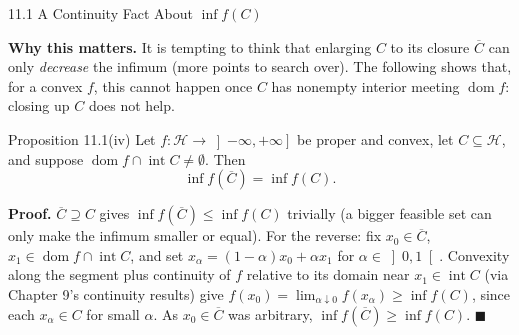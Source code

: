 \documentclass[aspectratio=169,10pt]{beamer}
\newcommand{\mHH}{\mathcal H}
\newcommand{\dom}{\operatorname{dom}}
\newcommand{\intr}{\operatorname{int}}
\begin{document}
\begin{frame}{11.1 A Continuity Fact About $\inf f(C)$}

  \textbf{Why this matters.} It is tempting to think that enlarging
  $C$ to its closure $\overline C$ can only \emph{decrease} the
  infimum (more points to search over). The following shows that,
  for a convex $f$, this cannot happen once $C$ has nonempty
  interior meeting $\dom f$: closing up $C$ does not help.

  \begin{block}{Proposition 11.1(iv)}
    Let $f:\mHH\to\left]-\infty,+\infty\right]$ be proper and convex,
    let $C\subseteq\mHH$, and suppose $\dom f\cap\intr C\neq\emptyset$.
    Then
    \[
      \inf f(\overline C) = \inf f(C).
    \]
  \end{block}

  \textbf{Proof.} $\overline C\supseteq C$ gives
  $\inf f(\overline C)\le\inf f(C)$ trivially (a bigger feasible set
  can only make the infimum smaller or equal). For the reverse: fix
  $x_0\in\overline C$, $x_1\in\dom f\cap\intr C$, and set
  $x_\alpha=(1-\alpha)x_0+\alpha x_1$ for $\alpha\in\left]0,1\right[$.
  Convexity along the segment plus continuity of $f$ relative to its
  domain near $x_1\in\intr C$ (via Chapter 9's continuity results)
  give $f(x_0)=\lim_{\alpha\downarrow0}f(x_\alpha)\ge\inf f(C)$, since
  each $x_\alpha\in C$ for small $\alpha$. As $x_0\in\overline C$ was
  arbitrary, $\inf f(\overline C)\ge\inf f(C)$. \hfill$\blacksquare$

\end{frame}
\end{document}
